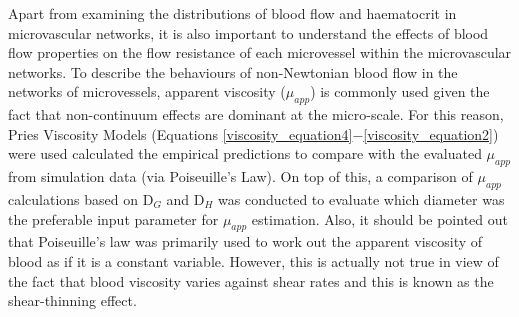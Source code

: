 \noindent Apart from examining the distributions of blood flow and haematocrit in microvascular networks, it is also important to understand the effects of blood flow properties on the flow resistance of each microvessel within the microvascular networks. To describe the behaviours of non-Newtonian blood flow in the networks of microvessels, apparent viscosity ($\mu_{app}$) is commonly used given the fact that non-continuum effects are dominant at the micro-scale. For this reason, Pries Viscosity Models\cite{Pries1992BloodHematocrit, PriesAR1994RtBF} (Equations \ref{viscosity_equation4}$-$\ref{viscosity_equation2}) were used calculated the empirical predictions to compare with the evaluated $\mu_{app}$ from simulation data (via Poiseuille's Law). On top of this, a comparison of $\mu_{app}$ calculations based on D$_{G}$ and D$_{H}$ was conducted to evaluate which diameter was the preferable input parameter for $\mu_{app}$ estimation. Also, it should be pointed out that Poiseuille’s law was primarily used to work out the apparent viscosity of blood as if it is a constant variable. However, this is actually not true in view of the fact that blood viscosity varies against shear rates and this is known as the shear-thinning effect.\cite{YELESWARAPU1998257, yeleswarapu1998evaluation, BodnarT2011Sott}


